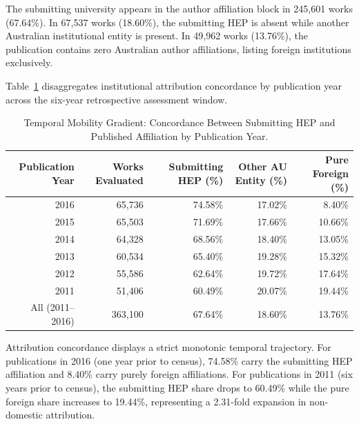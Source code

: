 The submitting university appears in the author affiliation block in 245,601 works (67.64\%). In 67,537 works (18.60\%), the submitting HEP is absent while another Australian institutional entity is present. In 49,962 works (13.76\%), the publication contains zero Australian author affiliations, listing foreign institutions exclusively.

Table~\ref{tab:temporal_gradient} disaggregates institutional attribution concordance by publication year across the six-year retrospective assessment window.

\begin{table}[htbp]
\centering
\caption{Temporal Mobility Gradient: Concordance Between Submitting HEP and Published Affiliation by Publication Year.}
\label{tab:temporal_gradient}
\begin{tabular*}{\textwidth}{@{\extracolsep{\fill}}rrrrr@{}}
\toprule
Publication Year & Works Evaluated & Submitting HEP (\%) & Other AU Entity (\%) & Pure Foreign (\%) \\
\midrule
2016 & 65,736 & 74.58\% & 17.02\% &  8.40\% \\
2015 & 65,503 & 71.69\% & 17.66\% & 10.66\% \\
2014 & 64,328 & 68.56\% & 18.40\% & 13.05\% \\
2013 & 60,534 & 65.40\% & 19.28\% & 15.32\% \\
2012 & 55,586 & 62.64\% & 19.72\% & 17.64\% \\
2011 & 51,406 & 60.49\% & 20.07\% & 19.44\% \\
\midrule
All (2011--2016) & 363,100 & 67.64\% & 18.60\% & 13.76\% \\
\bottomrule
\end{tabular*}
\end{table}

Attribution concordance displays a strict monotonic temporal trajectory. For publications in 2016 (one year prior to census), 74.58\% carry the submitting HEP affiliation and 8.40\% carry purely foreign affiliations. For publications in 2011 (six years prior to census), the submitting HEP share drops to 60.49\% while the pure foreign share increases to 19.44\%, representing a 2.31-fold expansion in non-domestic attribution.
